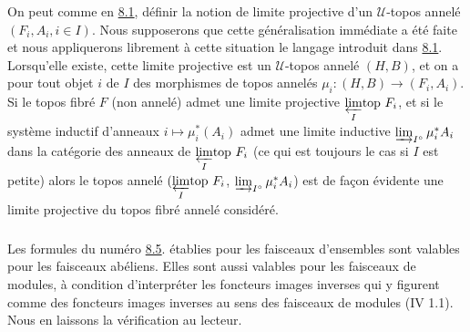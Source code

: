 \documentclass[10pt]{../fichiers-configuration-latex/smfart}
\begin{document}
On peut comme en \hyperref[VI.subsec8.1]{8.1}, définir la notion de limite
projective d'un $𝒰$-topos annelé $(F_i, A_i, i \in I)$. Nous
supposerons que cette généralisation immédiate a été faite et nous
appliquerons librement à cette situation le langage introduit dans
\hyperref[VI.subsec8.1]{8.1}. Lorsqu'elle existe, cette limite projective est
un $𝒰$-topos annelé $(H, B)$, et on a pour tout objet $i$ de
$I$ des morphismes de topos annelés $\mu_i : (H, B) \to (F_i, A_i)$.
Si le topos fibré $F$ (non annelé) admet une limite projective
${\displaystyle{\varprojlim_{I}\!\mbox{\rm top }}} F_i$, et si le système inductif d'anneaux $i \mapsto
\mu_i^{\ast}(A_i)$ admet une limite inductive
$\varinjlim_{I^{\circ}}\mu_i^{\ast} A_i$ dans la catégorie des
anneaux de ${\displaystyle{\varprojlim_{I}\!\mbox{\rm top }}} F_i$ (ce qui est toujours le cas si $I$ est
petite) alors le topos annelé $({\displaystyle{\varprojlim_{I}\!\mbox{\rm top }}} F_i$,
$\varinjlim_{I^{\circ}} \mu^{\ast}_i A_i$) est de façon évidente
une limite projective du topos fibré annelé considéré.

\subsubsection{}

Les formules du numéro \hyperref[VI.subsec8.5]{8.5}. établies pour les
faisceaux d'ensembles sont valables pour les faisceaux abéliens.
Elles sont aussi valables pour les faisceaux de modules, à condition
d'interpréter les foncteurs images inverses qui y figurent comme des
foncteurs images inverses au sens des faisceaux de modules (IV 1.1).
Nous en laissons la vérification au lecteur.

\subsubsection{}
\end{document}
